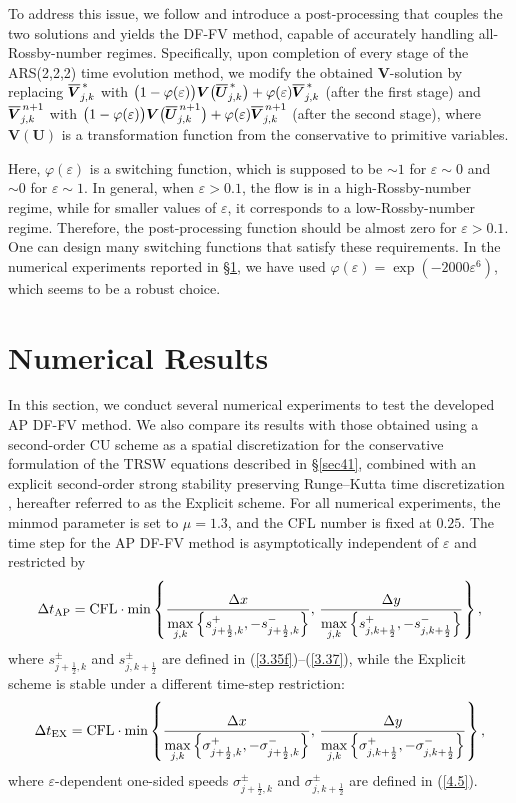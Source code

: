 \documentclass[a4paper,11pt,twoside]{article}
\numberwithin{equation}{section}
\numberwithin{figure}{section}
\numberwithin{table}{section}
\newcommand{\jR}{j+\frac{1}{2}}
\newcommand{\kR}{k+\frac{1}{2}}
\newcommand{\eps}{\varepsilon}
\newcommand{\dt}{\Delta t}
\newcommand{\dx}{\Delta x}
\newcommand{\dy}{\Delta y}
\newcommand{\bU}{\bm{U}}
\newcommand{\bV}{\bm{V}}
\newcommand\eref[1]{(\ref{#1})}
\newcommand*\xbar[1]{%
	\hbox{%
		\vbox{%
			\hrule height 0.5pt %
			\kern0.3ex%
			\hbox{%
				\kern-0.05em%
				\ensuremath{#1}%
				\kern-0.02em%
			}%
		}%
	}%
}
\begin{document}
To address this issue, we follow \cite{CKKM} and introduce a post-processing that couples the two solutions and yields the DF-FV method, 
capable of accurately handling all-Rossby-number regimes. Specifically, upon completion of every stage of the ARS(2,2,2) time evolution 
method, we modify the obtained $\bV$-solution by replacing $\xbar{\bV}^{\,*}_{j,k}$ with 
$\big(1-\varphi(\eps)\big)\bV\big(\xbar{\bU}^{\,*}_{j,k}\big)+\varphi(\eps)\xbar{\bV}^{\,*}_{j,k}$ (after the first stage) and 
$\xbar{\bV}^{\,n+1}_{j,k}$ with $\big(1-\varphi(\eps)\big)\bV\big(\xbar{\bU}_{j,k}^{\,n+1}\big)+\varphi(\eps)\xbar{\bV}^{\,n+1}_{j,k}$
(after the second stage), where $\bV(\bU)$ is a transformation function from the conservative to primitive variables.

Here, $\varphi(\eps)$ is a switching function, which is supposed to be $\sim1$ for $\eps\sim0$ and $\sim0$ for $\eps\sim1$. In general, when
$\eps>0.1$, the flow is in a high-Rossby-number regime, while for smaller values of $\eps$, it corresponds to a low-Rossby-number regime.
Therefore, the post-processing function should be almost zero for $\eps>0.1$. One can design many switching functions that satisfy these
requirements. In the numerical experiments reported in \S\ref{sec5}, we have used $\varphi(\eps)=\exp(-2000\eps^6)$, which seems to be a
robust choice.

\section{Numerical Results}\label{sec5}
In this section, we conduct several numerical experiments to test the developed AP DF-FV method. We also compare its results with those
obtained using a second-order CU scheme as a spatial discretization for the conservative formulation of the TRSW equations described in
\S\ref{sec41}, combined with an explicit second-order strong stability preserving Runge–Kutta time discretization \cite{Gottlieb_2001},
hereafter referred to as the Explicit scheme. For all numerical experiments, the minmod parameter is set to $\mu=1.3$, and the CFL number is
fixed at $0.25$. The time step for the AP DF-FV method is asymptotically independent of $\eps$ and restricted by 
\begin{equation*}
\dt_{\rm AP}={\rm CFL}\cdot\min\left\{\frac{\dx}{\max\limits_{j,k}\Big\{s_{\jR,k}^+,-s_{\jR,k}^-\Big\}},\,
\frac{\dy}{\max\limits_{j,k}\Big\{s_{j,\kR}^+,-s_{j,\kR}^-\Big\}}\right\},
\end{equation*}
where $s_{\jR,k}^{\pm}$ and $s_{j,\kR}^{\pm}$ are defined in \eref{3.35f}--\eref{3.37}, while the Explicit scheme is stable under a
different time-step restriction:
\begin{equation*}
\dt_{\rm EX}={\rm CFL}\cdot\min\left\{\frac{\dx}{\max\limits_{j,k}\Big\{\sigma_{\jR,k}^+,-\sigma_{\jR,k}^-\Big\}},\,
\frac{\dy}{\max\limits_{j,k}\Big\{\sigma_{j,\kR}^+,-\sigma_{j,\kR}^-\Big\}}\right\},
\end{equation*}
where $\eps$-dependent one-sided speeds $\sigma_{\jR,k}^\pm$ and $\sigma_{j,\kR}^\pm$ are defined in \eref{4.5}.
\end{document}
